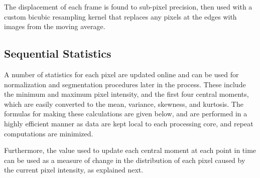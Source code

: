 \documentclass[
  12pt,
]{report}
\newenvironment{Shaded}{}{}
\newcommand{\CommentTok}[1]{\textcolor[rgb]{0.38,0.63,0.69}{\textit{#1}}}
\newcommand{\FloatTok}[1]{\textcolor[rgb]{0.25,0.63,0.44}{#1}}
\newcommand{\NormalTok}[1]{#1}
\numberwithin{figure}{section}
\numberwithin{table}{section}
\numberwithin{equations}{section}
\begin{document}
The displacement of each frame is found to sub-pixel precision, then
used with a custom bicubic resampling kernel that replaces any pixels at
the edges with images from the moving average.

\hypertarget{sequential-statistics}{%
\subsection{Sequential Statistics}\label{sequential-statistics}}

A number of statistics for each pixel are updated online and can be used
for normalization and segmentation procedures later in the process.
These include the minimum and maximum pixel intensity, and the first
four central moments, which are easily converted to the mean, variance,
skewness, and kurtosis. The formulas for making these calculations are
given below, and are performed in a highly efficient manner as data are
kept local to each processing core, and repeat computations are
minimized.

\begin{Shaded}
\end{Shaded}

Furthermore, the value used to update each central moment at each point
in time can be used as a measure of change in the distribution of each
pixel caused by the current pixel intensity, as explained next.
\end{document}
